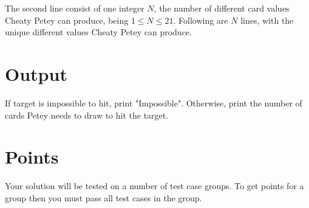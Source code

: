 The second line consist of one integer $N$, the number of different card values Cheaty Petey can produce, being $1\leq N \leq 21$. Following are $N$ lines, with the unique different values Cheaty Petey can produce.

\section*{Output}
If target is impossible to hit, print "Impossible". Otherwise, print the number of cards Petey needs to draw to hit the target.

\section*{Points}
Your solution will be tested on a number of test case groups. To get points for a group then you must pass all test cases in the group.
